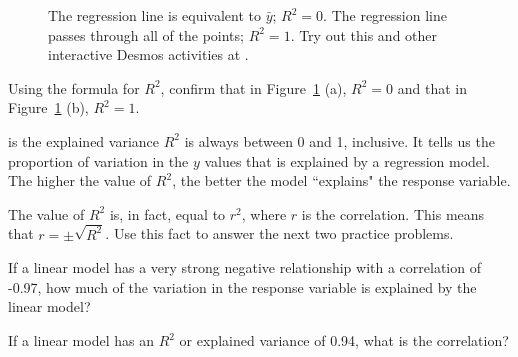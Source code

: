 \begin{figure}[ht]
  \centering
{}
  \caption{ The regression line is equivalent to $\bar{y}$; $R^2 = 0$.
       The regression line passes through all of the points; $R^2=1$.  Try out this and other interactive Desmos activities at .}
    \label{rSquared}
\end{figure}

\begin{exercisewrap}
\begin{nexercise}
Using the formula for $R^2$, confirm that in Figure~\ref{rSquared} (a), $R^2 = 0$ and that in Figure~\ref{rSquared} (b), $R^2 = 1$.\footnotemark
\end{nexercise}
\end{exercisewrap}

\begin{onebox}{ is the explained variance}
$R^2$ is always between 0 and 1, inclusive.  It tells us the proportion of variation in the $y$ values that is explained by a regression model.  The higher the value of $R^2$, the better the model ``explains" the response variable.
\end{onebox}

The value of $R^2$ is, in fact, equal to $r^2$, where $r$ is the correlation.  This means that  $r = \pm \sqrt{R^2}$.  Use this fact to answer the next two practice problems.

\begin{exercisewrap}
\begin{nexercise}
If a linear model has a very strong negative relationship with a correlation of -0.97, how much of the variation in the response variable is explained by the linear model?\footnotemark 
\end{nexercise}
\end{exercisewrap}

\begin{exercisewrap}
\begin{nexercise}
If a linear model has an $R^2$ or explained variance of 0.94, what is the correlation?\footnotemark 
\end{nexercise}
\end{exercisewrap}

